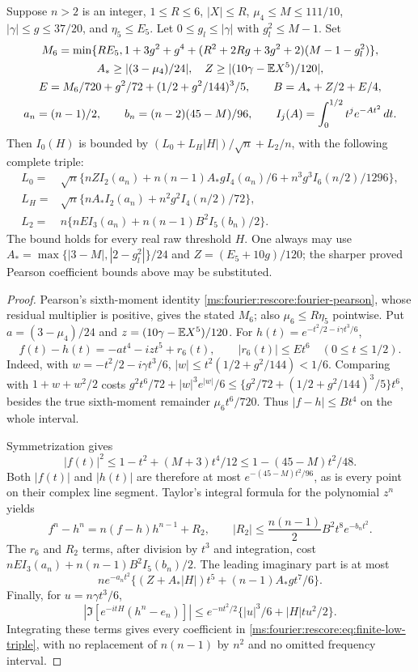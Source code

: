 \begin{lemma}\label{ms:fourier:rescore:lem:finite-low}
Suppose $n>2$ is an integer, $1\le R\le6$, $|X|\le R$,
$\mu_4\le M\le111/10$, $|\gamma|\le g\le37/20$,
and $\eta_5\le E_5$. Let $0\le g_l\le|\gamma|$ with $g_l^2\le M-1$.
Set
\begin{gather*}
 M_6=\min\{RE_5,
 1+3g^2+g^4+(R^2+2Rg+3g^2+2)(M-1-g_l^2)\},\\
 A_*\ge |(3-\mu_4)/24|,\quad
 Z\ge|(10\gamma-\mathbb E X^5)/120|,\\
 E=M_6/720+g^2/72+(1/2+g^2/144)^3/5,\qquad
 B=A_*+Z/2+E/4,\\
 a_n=(n-1)/2,\qquad b_n=(n-2)(45-M)/96,\qquad
 I_j(A)=\int_0^{1/2}t^je^{-At^2}\,dt.
\end{gather*}
Then $I_0(H)$ is bounded by $(L_0+L_H|H|)/\sqrt n+L_2/n$, with
the following complete triple:
\begin{align}
 L_0={}&\sqrt n\{nZI_2(a_n)
       +n(n-1)A_*gI_4(a_n)/6+n^3g^3I_6(n/2)/1296\},\nonumber\\
 L_H={}&\sqrt n\{nA_*I_2(a_n)+n^2g^2I_4(n/2)/72\},\nonumber\\
 L_2={}&n\{nEI_3(a_n)+n(n-1)B^2I_5(b_n)/2\}.
 \label{ms:fourier:rescore:eq:finite-low-triple}
\end{align}
The bound holds for every real raw threshold $H$.
One always may use
$A_*=\max\{|3-M|,|2-g_l^2|\}/24$ and $Z=(E_5+10g)/120$;
the sharper proved Pearson coefficient bounds above may be substituted.
\end{lemma}
\begin{proof}
Pearson's sixth-moment identity
\eqref{ms:fourier:rescore:fourier-pearson}, whose residual multiplier is positive,
gives the stated $M_6$; also $\mu_6\le R\eta_5$ pointwise.
Put $a=(3-\mu_4)/24$ and $z=(10\gamma-\mathbb E X^5)/120$.
For $h(t)=e^{-t^2/2-i\gamma t^3/6}$,
\[
 f(t)-h(t)=-at^4-izt^5+r_6(t),\qquad |r_6(t)|\le Et^6
 \quad(0\le t\le1/2).
\]
Indeed, with $w=-t^2/2-i\gamma t^3/6$,
$|w|\le t^2(1/2+g^2/144)<1/6$. Comparing with $1+w+w^2/2$
costs $g^2t^6/72+|w|^3e^{|w|}/6\le
\{g^2/72+(1/2+g^2/144)^3/5\}t^6$, besides the true sixth-moment
remainder $\mu_6t^6/720$. Thus $|f-h|\le Bt^4$ on the whole interval.

Symmetrization gives
\[
 |f(t)|^2\le1-t^2+(M+3)t^4/12
 \le1-(45-M)t^2/48.
\]
Both $|f(t)|$ and $|h(t)|$ are therefore at most
$e^{-(45-M)t^2/96}$, as is every point on their complex line segment.
Taylor's integral formula for the polynomial $z^n$ yields
\[
 f^n-h^n=n(f-h)h^{n-1}+R_2,\qquad
 |R_2|\le\frac{n(n-1)}2B^2t^8e^{-b_nt^2}.
\]
The $r_6$ and $R_2$ terms, after division by $t^3$ and integration,
cost $nEI_3(a_n)+n(n-1)B^2I_5(b_n)/2$.
The leading imaginary part is at most
\[
 ne^{-a_nt^2}\{(Z+A_*|H|)t^5+(n-1)A_*gt^7/6\}.
\]
Finally, for $u=n\gamma t^3/6$,
\[
 |\Im[e^{-itH}(h^n-e_n)]|
 \le e^{-nt^2/2}\{|u|^3/6+|H|t u^2/2\}.
\]
Integrating these terms gives every coefficient in
\eqref{ms:fourier:rescore:eq:finite-low-triple}, with no replacement of $n(n-1)$
by $n^2$ and no omitted frequency interval.
\end{proof}


